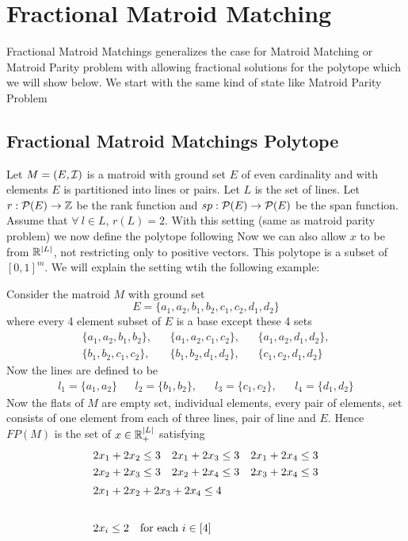 \chapter{Fractional Matroid Matching}
Fractional Matroid Matchings generalizes the case for Matroid Matching or Matroid Parity problem with allowing fractional solutions for the polytope which we will show below. We start with the same kind of state like Matroid Parity Problem
\section{Fractional Matroid Matchings Polytope}
Let $M=(E,\mathcal{I})$ is a matroid  with ground set $E$ of even cardinality and with elements $E$ is partitioned  into lines or pairs. Let $L$ is the  set of lines.  Let $r:\mathcal{P}(E)\to \mathbb{Z}$ be the rank function and $sp:\mathcal{P}(E)\to \mathcal{P}(E)$ be the span function. Assume that $\forall\ l\in L$, $r(L)=2$. With this setting (same as matroid parity problem) we now define the polytope following \cite{fraclinmat}
Now we can also allow $x$ to be from $\mathbb{R}^{|L|}$, not restricting only to positive vectors. This polytope is a subset of $[0,1]^m$. We will explain the setting wtih the following example:
\begin{example}{}{}
	Consider the matroid $M$ with ground set $$E=\{a_1,a_2,b_1,b_2,c_1,c_2,d_1,d_2\}$$where every 4 element subset of $E$ is a base except these 4 sets \begin{align*}
		\{a_1,a_2,b_1,b_2\}, && \{a_1,a_2,c_1,c_2\}, && \{a_1,a_2,d_1,d_2\},\\
		\{b_1,b_2,c_1,c_2\}, && \{b_1,b_2,d_1,d_2\}, && \{c_1,c_2,d_1,d_2\}
	\end{align*}Now the lines are  defined to be \begin{align*}
	l_1=\{a_1,a_2\} && l_2=\{b_1,b_2\}, && l_3=\{c_1,c_2\}, && l_4=\{d_1,d_2\}
	\end{align*} Now the flats of $M$ are empty set, individual elements, every pair of elements, set consists of one element from each of three lines, pair of line and $E$. Hence $FP(M)$ is the set of $x\in\mathbb{R}^{|L|}_+$ satisfying \begin{align*}
	2x_1+2x_2\leq 3 && 2x_1+2x_3\leq 3 && 2x_1+2x_4\leq 3\\
	2x_2+2x_3\leq 3 && 2x_2+2x_4\leq 3 && 2x_3+2x_4\leq 3\\
	\shortintertext{\centering $2x_1+2x_2+2x_3+2x_4\leq 4$} \\
	\shortintertext{\centering $2x_i\leq 2\quad \text{for each $i\in[4]$}$}
	\end{align*}
\end{example}
